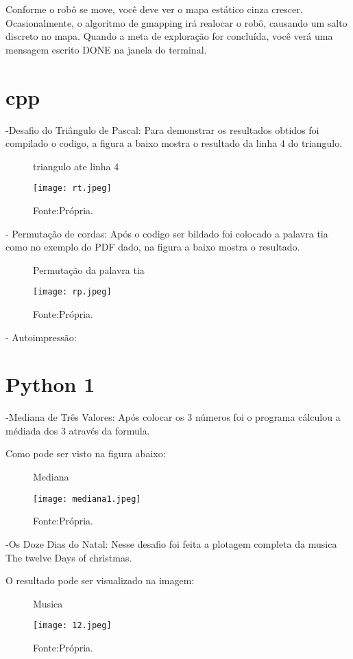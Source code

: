 Conforme o robô se move, você deve ver o mapa estático cinza crescer. Ocasionalmente, o algoritmo de gmapping irá realocar o robô, causando um salto discreto no mapa. Quando a meta de exploração for concluída, você verá uma mensagem escrito DONE na janela do terminal.
\section{cpp}
-Desafio do Triângulo de Pascal:
Para demonstrar os resultados obtidos foi compilado o codigo, a figura a baixo mostra o resultado da linha 4 do triangulo.
\begin{figure} [h!]	
    \centering
    \caption{triangulo ate linha 4}
    \texttt{[image: rt.jpeg]}
    \caption*{Fonte:Própria.}
    \label{fig:triangulodepascal}
\end{figure}

- Permutação de cordas:
Após o codigo ser bildado foi colocado a palavra tia como no exemplo do PDF dado, na figura a baixo mostra o resultado.
\begin{figure} [h!]	
    \centering
    \caption{Permutação da palavra tia}
    \texttt{[image: rp.jpeg]}
    \caption*{Fonte:Própria.}
    \label{fig:permutacao}
\end{figure}
- Autoimpressão:

\section{Python 1}
-Mediana de Três Valores:
Após colocar os 3 números foi o programa cálculou a médiada dos 3 através da formula.

Como pode ser visto na figura abaixo:
\begin{figure} [h!]	
    \centering
    \caption{Mediana}
    \texttt{[image: mediana1.jpeg]}
    \caption*{Fonte:Própria.}
    \label{fig:med}
\end{figure}

-Os Doze Dias do Natal:
Nesse desafio foi feita a plotagem completa da musica The twelve Days of christmas.

O resultado pode ser visualizado na imagem:
\begin{figure} [h!]	
    \centering
    \caption{Musica}
    \texttt{[image: 12.jpeg]}
    \caption*{Fonte:Própria.}
    \label{fig:musica}
\end{figure}



